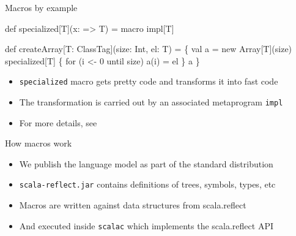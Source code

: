 \documentclass[svgnames,dvipsnames,hyperref={bookmarks=false},usepdftitle=false]{beamer}
\begin{document}
\begin{frame}[fragile]{Macros by example}

\begin{semiverbatim}
\alert{def specialized[T](x: => T) = macro impl[T]}

def createArray[T: ClassTag](size: Int, el: T) = \{
  val a = new Array[T](size)
  \alert{specialized[T] \{}
    for (i <- 0 until size) a(i) = el
  \alert{\}}
  a
\}

\end{semiverbatim}

\begin{itemize}
\item \texttt{specialized} macro gets pretty code and transforms it into fast code
\item The transformation is carried out by an associated metaprogram \texttt{impl}
\item For more details, see 
\end{itemize}
\end{frame}

\begin{frame}{How macros work}

\begin{itemize}
\item We publish the language model as part of the standard distribution
\item \texttt{scala-reflect.jar} contains definitions of trees, symbols, types, etc
\item Macros are written against data structures from scala.reflect
\item And executed inside \texttt{scalac} which implements the scala.reflect API
\end{itemize}

\end{frame}
\end{document}
